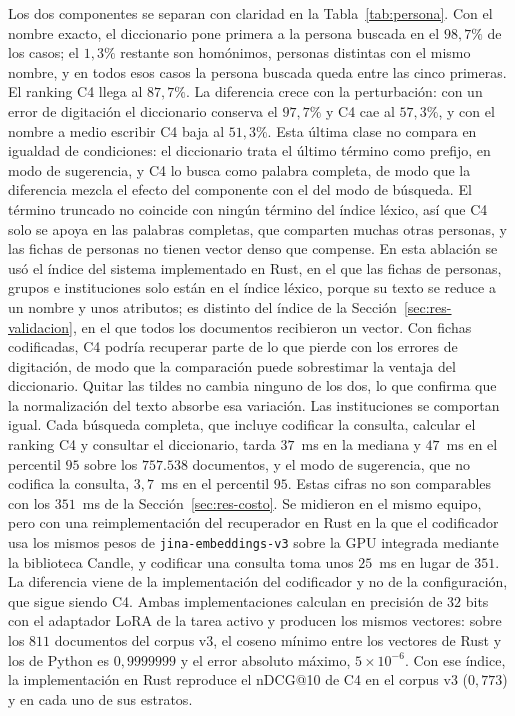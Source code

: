 \documentclass[11pt,letterpaper]{article}
\numberwithin{equation}{section}
\begin{document}
Los dos componentes se separan con claridad en la Tabla~\ref{tab:persona}. Con el nombre exacto, el diccionario pone primera a la persona buscada en el $98{,}7\%$ de los casos; el $1{,}3\%$ restante son homónimos, personas distintas con el mismo nombre, y en todos esos casos la persona buscada queda entre las cinco primeras. El ranking C4 llega al $87{,}7\%$. La diferencia crece con la perturbación: con un error de digitación el diccionario conserva el $97{,}7\%$ y C4 cae al $57{,}3\%$, y con el nombre a medio escribir C4 baja al $51{,}3\%$. Esta última clase no compara en igualdad de condiciones: el diccionario trata el último término como prefijo, en modo de sugerencia, y C4 lo busca como palabra completa, de modo que la diferencia mezcla el efecto del componente con el del modo de búsqueda. El término truncado no coincide con ningún término del índice léxico, así que C4 solo se apoya en las palabras completas, que comparten muchas otras personas, y las fichas de personas no tienen vector denso que compense. En esta ablación se usó el índice del sistema implementado en Rust, en el que las fichas de personas, grupos e instituciones solo están en el índice léxico, porque su texto se reduce a un nombre y unos atributos; es distinto del índice de la Sección~\ref{sec:res-validacion}, en el que todos los documentos recibieron un vector. Con fichas codificadas, C4 podría recuperar parte de lo que pierde con los errores de digitación, de modo que la comparación puede sobrestimar la ventaja del diccionario. Quitar las tildes no cambia ninguno de los dos, lo que confirma que la normalización del texto absorbe esa variación. Las instituciones se comportan igual. Cada búsqueda completa, que incluye codificar la consulta, calcular el ranking C4 y consultar el diccionario, tarda $37$~ms en la mediana y $47$~ms en el percentil $95$ sobre los $757.538$ documentos, y el modo de sugerencia, que no codifica la consulta, $3{,}7$~ms en el percentil $95$. Estas cifras no son comparables con los $351$~ms de la Sección~\ref{sec:res-costo}. Se midieron en el mismo equipo, pero con una reimplementación del recuperador en Rust en la que el codificador usa los mismos pesos de \texttt{jina-embeddings-v3} sobre la GPU integrada mediante la biblioteca Candle, y codificar una consulta toma unos $25$~ms en lugar de $351$. La diferencia viene de la implementación del codificador y no de la configuración, que sigue siendo C4. Ambas implementaciones calculan en precisión de $32$ bits con el adaptador LoRA de la tarea activo y producen los mismos vectores: sobre los $811$ documentos del corpus v3, el coseno mínimo entre los vectores de Rust y los de Python es $0{,}9999999$ y el error absoluto máximo, $5\times10^{-6}$. Con ese índice, la implementación en Rust reproduce el nDCG@10 de C4 en el corpus v3 ($0{,}773$) y en cada uno de sus estratos.
\end{document}
